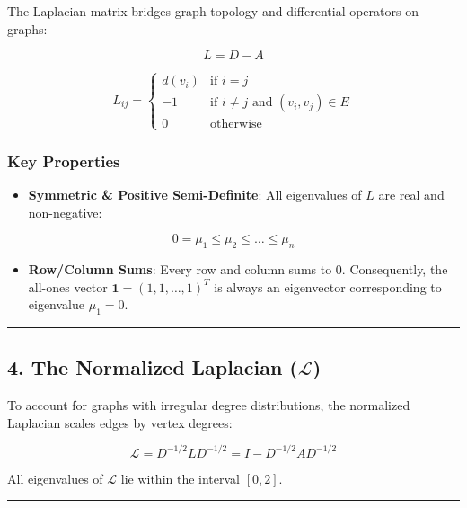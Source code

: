\documentclass[
]{book}
\providecommand{\tightlist}{%
  \setlength{\itemsep}{0pt}\setlength{\parskip}{0pt}}
\theoremstyle{definition}
\theoremstyle{definition}
\theoremstyle{definition}
\theoremstyle{definition}
\theoremstyle{remark}
\begin{document}
The Laplacian matrix bridges graph topology and differential operators on graphs:

\[L = D - A\]

\[L_{ij} = \begin{cases} d(v_i) & \text{if } i = j \\ -1 & \text{if } i \neq j \text{ and } (v_i, v_j) \in E \\ 0 & \text{otherwise} \end{cases}\]

\subsubsection{Key Properties}\label{key-properties-2}

\begin{itemize}
\tightlist
\item
  \textbf{Symmetric \& Positive Semi-Definite}: All eigenvalues of \(L\) are real and non-negative:
\end{itemize}

\[0 = \mu_1 \le \mu_2 \le \dots \le \mu_n\]

\begin{itemize}
\tightlist
\item
  \textbf{Row/Column Sums}: Every row and column sums to \(0\). Consequently, the all-ones vector \(\mathbf{1} = (1, 1, \dots, 1)^T\) is always an eigenvector corresponding to eigenvalue \(\mu_1 = 0\).
\end{itemize}

\begin{center}\rule{0.5\linewidth}{0.5pt}\end{center}

\subsection{\texorpdfstring{4. The Normalized Laplacian (\(\mathcal{L}\))}{4. The Normalized Laplacian (\textbackslash mathcal\{L\})}}\label{the-normalized-laplacian-mathcall}

To account for graphs with irregular degree distributions, the normalized Laplacian scales edges by vertex degrees:

\[\mathcal{L} = D^{-1/2} L D^{-1/2} = I - D^{-1/2} A D^{-1/2}\]

All eigenvalues of \(\mathcal{L}\) lie within the interval \([0, 2]\).

\begin{center}\rule{0.5\linewidth}{0.5pt}\end{center}
\end{document}

